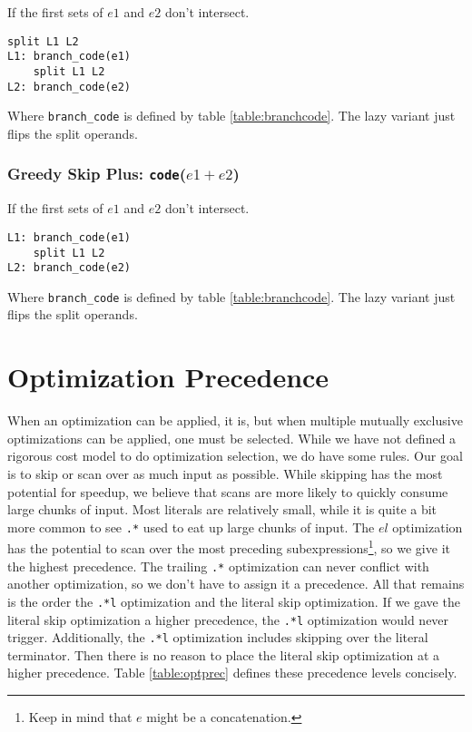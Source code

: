 If the first sets of $e1$ and $e2$ don't intersect.

\begin{verbatim}
split L1 L2
L1: branch_code(e1)
    split L1 L2
L2: branch_code(e2)
\end{verbatim}

Where \verb'branch_code' is defined by table \ref{table:branchcode}.
The lazy variant just flips the split operands.

\subsubsection{Greedy Skip Plus: {\tt code}($e1+e2$)}

If the first sets of $e1$ and $e2$ don't intersect.

\begin{verbatim}
L1: branch_code(e1)
    split L1 L2
L2: branch_code(e2)
\end{verbatim}

Where \verb'branch_code' is defined by table \ref{table:branchcode}.
The lazy variant just flips the split operands.

\section{Optimization Precedence}
\label{section:optprecedence}

When an optimization can be applied, it is, but when multiple
mutually exclusive optimizations can be applied, one must be
selected. While we have not defined a rigorous cost model
to do optimization selection, we do have some rules.
Our goal is to skip or scan over as much input as possible.
While skipping has the most potential for speedup, we
believe that scans are more likely to quickly consume large
chunks of input. Most literals are relatively small, while
it is quite a bit more common to see \verb'.*' used to eat
up large chunks of input. The $el$ optimization has the
potential to scan over the most preceding subexpressions\footnote{
Keep in mind that $e$ might be a concatenation.},
so we give it the highest precedence. The trailing \verb'.*' optimization
can never conflict with another optimization, so we don't have to
assign it a precedence. All that remains is the order the \verb'.*l'
optimization and the literal skip optimization. If we gave the
literal skip optimization a higher precedence, the \verb'.*l'
optimization would never trigger. Additionally, the \verb'.*l'
optimization includes skipping over the literal terminator.
Then there is no reason to place the literal skip optimization
at a higher precedence. Table \ref{table:optprec} defines these
precedence levels concisely.

